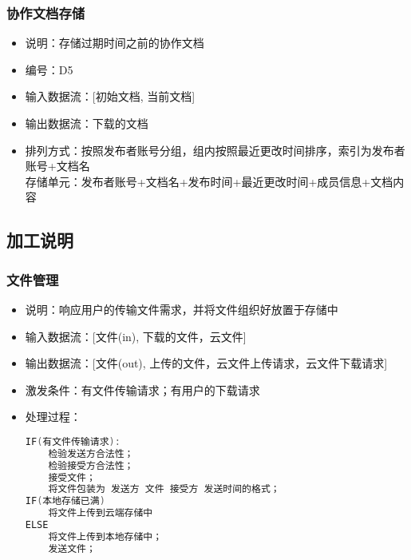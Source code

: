 \begin{itemize}
            \subsubsection{协作文档存储}
            \begin{itemize}
                \item 说明：存储过期时间之前的协作文档
                \item 编号：D5
                \item 输入数据流：[初始文档, 当前文档]
                \item 输出数据流：下载的文档
                \item 排列方式：按照发布者账号分组，组内按照最近更改时间排序，索引为发布者账号+文档名\\
                         存储单元：发布者账号+文档名+发布时间+最近更改时间+成员信息+文档内容\\
            \end{itemize}
        \subsection{加工说明}
            \subsubsection{文件管理}
            \begin{itemize}
                \item 说明：响应用户的传输文件需求，并将文件组织好放置于存储中
                \item 输入数据流：[文件(in), 下载的文件，云文件]
                \item 输出数据流：[文件(out), 上传的文件，云文件上传请求，云文件下载请求]
                \item 激发条件：有文件传输请求；有用户的下载请求
                \item 处理过程：
\begin{lstlisting}[language=C, caption=文件管理, label={code:first-code}]
IF(有文件传输请求):
    检验发送方合法性；
    检验接受方合法性；
    接受文件；
    将文件包装为 发送方 文件 接受方 发送时间的格式；
IF(本地存储已满) 
    将文件上传到云端存储中
ELSE 
    将文件上传到本地存储中；
    发送文件；
                

\end{lstlisting}
\end{itemize}
\end{itemize}
